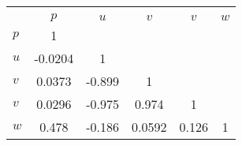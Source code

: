 \begin{tabular}{l*{5}{c}}
\toprule
                &\multicolumn{5}{c}{}                             \\
                &    $ p $&    $ u $&    $ v $&    $ v $&    $ w $\\
\midrule
$ p $           &        1&         &         &         &         \\
$ u $           &  -0.0204&        1&         &         &         \\
$ v $           &   0.0373&   -0.899&        1&         &         \\
$ v $           &   0.0296&   -0.975&    0.974&        1&         \\
$ w $           &    0.478&   -0.186&   0.0592&    0.126&        1\\
\bottomrule
\end{tabular}
